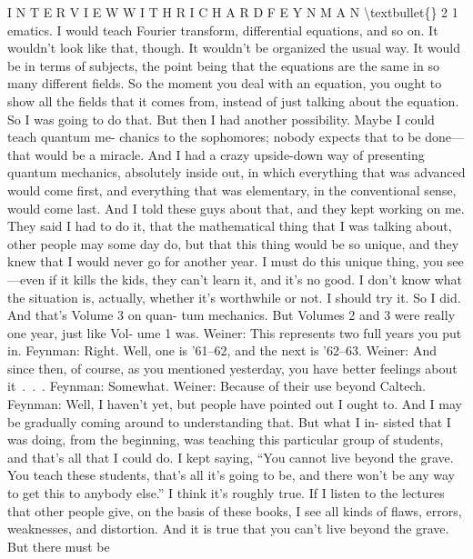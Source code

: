 \documentclass[10pt,oneside]{article}
\begin{document}
I N T E R V I E W  W I T H  R I C H A R D  F E Y N M A N \textbackslash{}textbullet\{\} 2 1 ematics. I would teach Fourier transform, differential equations, and so on. It wouldn’t look like that, though. It wouldn’t be organized the usual way. It would be in terms of subjects, the point being that the equations are the same in so many different fields. So the moment you deal with an equation, you ought to show all the fields that it comes from, instead of just talking about the equation. So I was going to do that. But then I had another possibility. Maybe I could teach quantum me- chanics to the sophomores; nobody expects that to be done---that would be a miracle. And I had a crazy upside-down way of presenting quantum mechanics, absolutely inside out, in which everything that was advanced would come first, and everything that was elementary, in the conventional sense, would come last. And I told these guys about that, and they kept working on me. They said I had to do it, that the mathematical thing that I was talking about, other people may some day do, but that this thing would be so unique, and they knew that I would never go for another year. I must do this unique thing, you see---even if it kills the kids, they can’t learn it, and it’s no good. I don’t know what the situation is, actually, whether it’s worthwhile or not. I should try it. So I did. And that’s Volume 3 on quan- tum mechanics. But Volumes 2 and 3 were really one year, just like Vol- ume 1 was. Weiner: This represents two full years you put in. Feynman: Right. Well, one is ’61–62, and the next is ’62–63. Weiner: And since then, of course, as you mentioned yesterday, you have better feelings about it . . . Feynman: Somewhat. Weiner: Because of their use beyond Caltech. Feynman: Well, I haven’t yet, but people have pointed out I ought to. And I may be gradually coming around to understanding that. But what I in- sisted that I was doing, from the beginning, was teaching this particular group of students, and that’s all that I could do. I kept saying, “You cannot live beyond the grave. You teach these students, that’s all it’s going to be, and there won’t be any way to get this to anybody else.” I think it’s roughly true. If I listen to the lectures that other people give, on the basis of these books, I see all kinds of flaws, errors, weaknesses, and distortion. And it is true that you can’t live beyond the grave. But there must be\par
\end{document}
